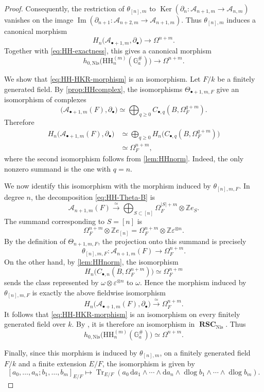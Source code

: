 \documentclass[a4paper,12pt,reqno]{amsart}
\numberwithin{equation}{section}
\theoremstyle{definition}
\newcommand{\Z}{\mathbb{Z}}
\DeclareMathOperator{\dlog}{dlog}
\DeclareMathOperator{\img}{Im}
\DeclareMathOperator{\Ker}{Ker}
\DeclareMathOperator{\Tr}{Tr}
\renewcommand{\d}{\mathrm{d}}
\newcommand{\RSC}{{\operatorname{\mathbf{RSC}}}}
\newcommand{\Acal}{\mathcal{A}}
\newcommand{\GaSharp}{\mathbb{G}_{a}^{\#}}
\newcommand{\Nis}{\mathrm{Nis}}
\begin{document}
\begin{proof}
Consequently, the restriction of $\theta_{[n],m}$ to $\Ker\left(\partial_n:\Acal_{n+1,m}\to\Acal_{n,m}\right)$ 
vanishes on the image $\img\left(\partial_{n+1}:\Acal_{n+2,m}\to\Acal_{n+1,m}\right)$.
Thus $\theta_{[n],m}$ induces a canonical morphism
\begin{equation}\label{eq:HH-induced-map}
 H_n\bigl(\Acal_{\bullet+1,m},\partial_\bullet\bigr)
 \to
 \Omega^{n+m}.
\end{equation}
Together with \eqref{eq:HH-exactness}, this gives a canonical morphism
\begin{equation}\label{eq:HH-HKR-morphism}
 h_{0,\Nis}\bigl(\mathrm{HH}_n^{(m)}(\GaSharp)\bigr)
 \to
 \Omega^{n+m}.
\end{equation}

We show that \eqref{eq:HH-HKR-morphism} is an isomorphism.
Let $F/k$ be a finitely generated field.  By
\autoref{prop:HHcomplex}, the isomorphisms
$\Theta_{\bullet+1,m,F}$ give an isomorphism of complexes
\[
 \bigl(\Acal_{\bullet+1,m}(F),\partial_\bullet\bigr)
 \simeq
 \bigoplus_{q\geq0}
 C_{\bullet,q}(B,\Omega_F^{q+m}).
\]
Therefore
\begin{align*}
 H_n\bigl(\Acal_{\bullet+1,m}(F),\partial_\bullet\bigr)
 &\simeq
 \bigoplus_{q\geq0}
 H_n\bigl(C_{\bullet,q}(B,\Omega_F^{q+m})\bigr)\\
 &\simeq
 \Omega_F^{n+m},
\end{align*}
where the second isomorphism follows from \autoref{lem:HHnorm}.
Indeed, the only nonzero summand is the one with $q=n$.

We now identify this isomorphism with the morphism induced by
$\theta_{[n],m,F}$.  In degree $n$, the decomposition
\eqref{eq:HH-Theta-B} is
\[
 \Acal_{n+1,m}(F)
 \xrightarrow{\simeq}
 \bigoplus_{S\subset[n]}
 \Omega_F^{|S|+m}\otimes\Z e_S.
\]
The summand corresponding to $S=[n]$ is
\[
 \Omega_F^{n+m}\otimes\Z e_{[n]}
 =
 \Omega_F^{n+m}\otimes\Z\varepsilon^{\otimes n}.
\]
By the definition of $\Theta_{n+1,m,F}$, the projection onto this
summand is precisely
\[
 \theta_{[n],m,F}:
 \Acal_{n+1,m}(F)\to\Omega_F^{n+m}.
\]
On the other hand, by \autoref{lem:HHnorm}, the isomorphism
\[
 H_n\bigl(C_{\bullet,n}(B,\Omega_F^{n+m})\bigr)
 \simeq
 \Omega_F^{n+m}
\]
sends the class represented by $\omega\otimes\varepsilon^{\otimes n}$ to $\omega$. 
Hence the morphism induced by
$\theta_{[n],m,F}$ is exactly the above fieldwise isomorphism
\[
 H_n\bigl(\Acal_{\bullet+1,m}(F),\partial_\bullet\bigr)
 \xrightarrow{\simeq}
 \Omega_F^{n+m}.
\]
It follows that \eqref{eq:HH-HKR-morphism} is an isomorphism on every
finitely generated field over $k$.  By \cite[Lemma~4.16]{RSY22}, it is
therefore an isomorphism in $\RSC_{\Nis}$.  Thus
\[
 h_{0,\Nis}\bigl(\mathrm{HH}_n^{(m)}(\GaSharp)\bigr)
 \simeq
 \Omega^{n+m}.
\]

Finally, since this morphism is induced by $\theta_{[n],m}$, on 
a finitely generated field $F/k$ and a finite extension $E/F$, 
the isomorphism is given by 
\[
 [a_0,\ldots,a_n;b_1,\ldots,b_m]_{E/F}
 \mapsto
 \Tr_{E/F}\left(
 a_0\,\d a_1\wedge\cdots\wedge\d a_n
 \wedge
 \dlog b_1\wedge\cdots\wedge\dlog b_m
 \right).
\]
\end{proof}
\end{document}
